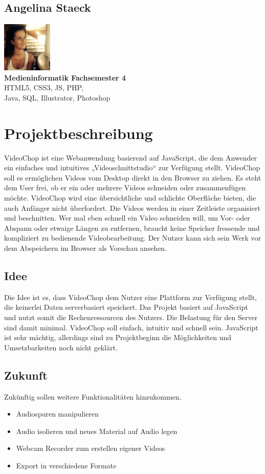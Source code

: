 \documentclass[a4paper,10pt]{scrartcl}
\begin{document}
\subsection{Angelina Staeck}
\begin{center}
\includegraphics[height=90px, width=90px]{images/angi.jpg}\\
\textbf{Medieninformatik Fachsemester 4} \\
\vspace*{1.5mm} 
HTML5, CSS3, JS, PHP, \\
Java, SQL, Illustrator, Photoshop
\end{center}
\newpage
\section{Projektbeschreibung}
VideoChop ist eine Webanwendung basierend auf JavaScript, die dem Anwender  ein einfaches und intuitives „Videoschnittstudio“ zur Verfügung stellt. VideoChop soll es ermöglichen Videos vom Desktop direkt in den Browser zu ziehen. Es steht dem User frei, ob er ein oder mehrere Videos schneiden oder zusammenfügen möchte. VideoChop wird eine übersichtliche und schlichte Oberfläche bieten, die auch Anfänger nicht überfordert. Die Videos werden in einer Zeitleiste organisiert und beschnitten. Wer mal eben schnell ein Video schneiden will, um Vor- oder Abspann oder etwaige Längen zu entfernen, braucht keine Speicher fressende und kompliziert zu bedienende Videobearbeitung. Der Nutzer kann sich sein Werk vor dem Abspeichern im Browser als Vorschau ansehen.
\subsection{Idee}
Die Idee ist es, dass VideoChop dem Nutzer eine Plattform zur Verfügung stellt, die keinerlei Daten serverbasiert speichert. Das Projekt basiert auf JavaScript und nutzt somit die Rechenressourcen des Nutzers. Die Belastung für den Server sind damit minimal. VideoChop soll einfach, intuitiv und schnell sein. JavaScript ist sehr mächtig, allerdings sind zu Projektbeginn die Möglichkeiten und Umsetzbarkeiten noch nicht geklärt.
\subsection{Zukunft}
Zukünftig sollen weitere Funktionalitäten hinzukommen. 
\begin{itemize}
	\item Audiospuren manipulieren
	\item Audio isolieren und neues Material auf Audio legen
	\item Webcam Recorder zum erstellen eigener Videos
	\item Export in verschiedene Formate
	\end{itemize}
\end{document}
